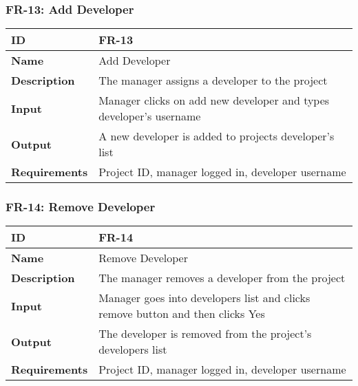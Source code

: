     \subsubsection{FR-13: Add Developer}
    \begin{center}
        \begin{tabularx}{\textwidth}{|l|X|}
            \hline
            \textbf{ID} & FR-13 \\
            \hline
            \textbf{Name} & Add Developer \\
            \hline
            \textbf{Description} & The manager assigns a developer to the project \\
            \hline
            \textbf{Input} & Manager clicks on add new developer and types developer's username \\
            \hline
            \textbf{Output} & A new developer is added to projects developer's list \\
            \hline
            \textbf{Requirements} & Project ID, manager logged in, developer username \\
            \hline
        \end{tabularx}
    \end{center}
    
    

    \subsubsection{FR-14: Remove Developer}
    \begin{center}
        \begin{tabularx}{\textwidth}{|l|X|}
            \hline
            \textbf{ID} & FR-14 \\
            \hline
            \textbf{Name} & Remove Developer \\
            \hline
            \textbf{Description} & The manager removes a developer from the project \\
            \hline
            \textbf{Input} & Manager goes into developers list and clicks remove button and then clicks Yes \\
            \hline
            \textbf{Output} & The developer is removed from the project's developers list \\
            \hline
            \textbf{Requirements} & Project ID, manager logged in, developer username \\
            \hline
        \end{tabularx}
    \end{center}
    
